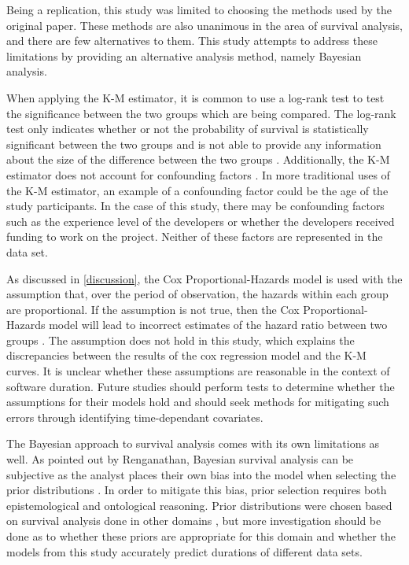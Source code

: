 \documentclass[acmconf]{acmart}
\begin{document}
Being a replication, this study was limited to choosing the methods used by the original paper.
These methods are also unanimous in the area of survival analysis, and there are few alternatives to them.
This study attempts to address these limitations by providing an alternative analysis method, namely Bayesian analysis.

When applying the K-M estimator, it is common to use a log-rank test to test the significance between the two groups which are being compared.
The log-rank test only indicates whether or not the probability of survival is statistically significant between the two groups and is not able to provide any information about the size of the difference between the two groups \cite{stel2011kaplan}.
Additionally, the K-M estimator does not account for confounding factors \cite{stel2011kaplan}.
In more traditional uses of the K-M estimator, an example of a confounding factor could be the age of the study participants.
In the case of this study, there may be confounding factors such as the experience level of the developers or whether the developers received funding to work on the project.
Neither of these factors are represented in the data set.

As discussed in \ref{discussion}, the Cox Proportional-Hazards model is used with the assumption that, over the period of observation, the hazards within each group are proportional.
If the assumption is not true, then the Cox Proportional-Hazards model will lead to incorrect estimates of the hazard ratio between two groups \cite{stel2011cox}.
The assumption does not hold in this study, which explains the discrepancies between the results of the cox regression model and the K-M curves.
It is unclear whether these assumptions are reasonable in the context of software duration.
Future studies should perform tests to determine whether the assumptions for their models hold and should seek methods for mitigating such errors through identifying time-dependant covariates.

The Bayesian approach to survival analysis comes with its own limitations as well.
As pointed out by Renganathan, Bayesian survival analysis can be subjective as the analyst places their own bias into the model when selecting the prior distributions \cite{renganathan2016overview}.
In order to mitigate this bias, prior selection requires both epistemological and ontological reasoning.
Prior distributions were chosen based on survival analysis done in other domains \cite{kelter2020bayesian, rethinking}, but more investigation should be done as to whether these priors are appropriate for this domain and whether the models from this study accurately predict durations of different data sets.
\end{document}
